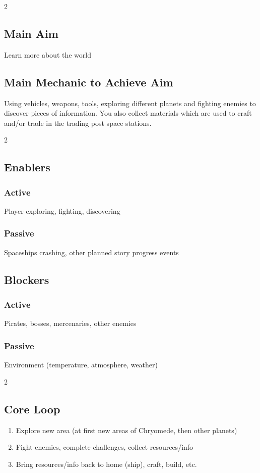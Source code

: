 \documentclass[10pt,a4paper]{article}
\begin{document}
\begin{multicols*}{2}
  \columnbreak

  \subsection{Main Aim}
  Learn more about the world

  \subsection{Main Mechanic to Achieve Aim}
  Using vehicles, weapons, tools, exploring different planets and fighting enemies to discover pieces of information. You also collect materials which are used to craft and/or trade in the trading post space stations.

  \begin{multicols}{2}
    \subsection{Enablers}
    \subsubsection{Active}
    Player exploring, fighting, discovering
    \subsubsection{Passive}
    Spaceships crashing, other planned story progress events
    \columnbreak
    \subsection{Blockers}
    \subsubsection{Active}
    Pirates, bosses, mercenaries, other enemies
    \subsubsection{Passive}
    Environment (temperature, atmosphere, weather)
  \end{multicols}
  
  \begin{multicols}{2}
    \subsection {Core Loop}
    \begin{enumerate}
      \item Explore new area (at first new areas of Chryomede, then other planets)
      \item Fight enemies, complete challenges, collect resources/info
      \item Bring resources/info back to home (ship), craft, build, etc.
    \end{enumerate}
    \columnbreak

\end{multicols}
\end{multicols*}
\end{document}
